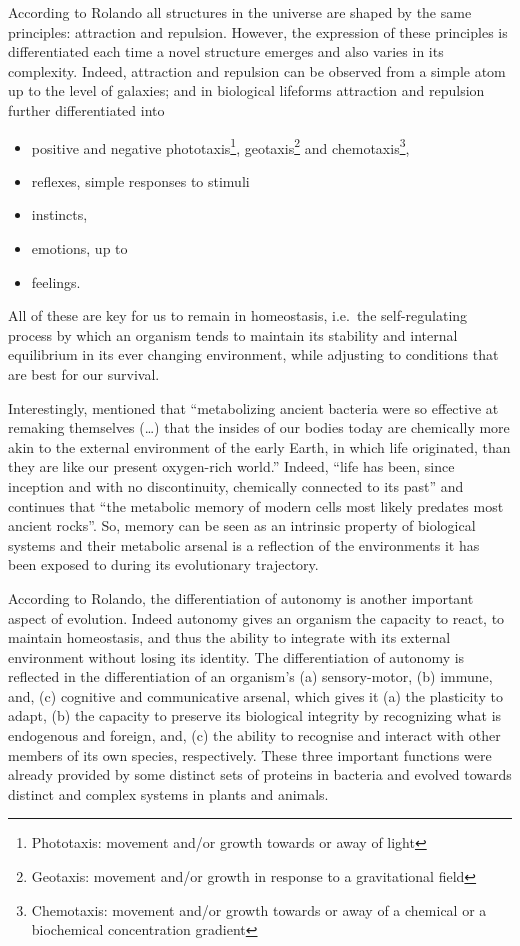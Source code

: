 \documentclass[
  11pt,
]{book}
\providecommand{\tightlist}{%
  \setlength{\itemsep}{0pt}\setlength{\parskip}{0pt}}
\begin{document}
According to Rolando all structures in the universe are shaped by the same principles: attraction and repulsion. However, the expression of these principles is differentiated each time a novel structure emerges and also varies in its complexity. Indeed, attraction and repulsion can be observed from a simple atom up to the level of galaxies; and in biological lifeforms attraction and repulsion further differentiated into

\begin{itemize}
\tightlist
\item
  positive and negative phototaxis\footnote{Phototaxis: movement and/or growth towards or away of light}, geotaxis\footnote{Geotaxis: movement and/or growth in response to a gravitational field} and chemotaxis\footnote{Chemotaxis: movement and/or growth towards or away of a chemical or a biochemical concentration gradient},
\item
  reflexes, simple responses to stimuli
\item
  instincts,
\item
  emotions, up to
\item
  feelings.
\end{itemize}

All of these are key for us to remain in homeostasis, i.e.~the self-regulating process by which an organism tends to maintain its stability and internal equilibrium in its ever changing environment, while adjusting to conditions that are best for our survival.

Interestingly, \citet{margulis1999} mentioned that ``metabolizing ancient bacteria were so effective at remaking themselves (\ldots) that the insides of our bodies today are chemically more akin to the external environment of the early Earth, in which life originated, than they are like our present oxygen-rich world.'' Indeed, ``life has been, since inception and with no discontinuity, chemically connected to its past'' and \citet{margulis1999} continues that ``the metabolic memory of modern cells most likely predates most ancient rocks''. So, memory can be seen as an intrinsic property of biological systems and their metabolic arsenal is a reflection of the environments it has been exposed to during its evolutionary trajectory.

According to Rolando, the differentiation of autonomy is another important aspect of evolution. Indeed autonomy gives an organism the capacity to react, to maintain homeostasis, and thus the ability to integrate with its external environment without losing its identity. The differentiation of autonomy is reflected in the differentiation of an organism's (a) sensory-motor, (b) immune, and, (c) cognitive and communicative arsenal, which gives it (a) the plasticity to adapt, (b) the capacity to preserve its biological integrity by recognizing what is endogenous and foreign, and, (c) the ability to recognise and interact with other members of its own species, respectively. These three important functions were already provided by some distinct sets of proteins in bacteria and evolved towards distinct and complex systems in plants and animals.
\end{document}
